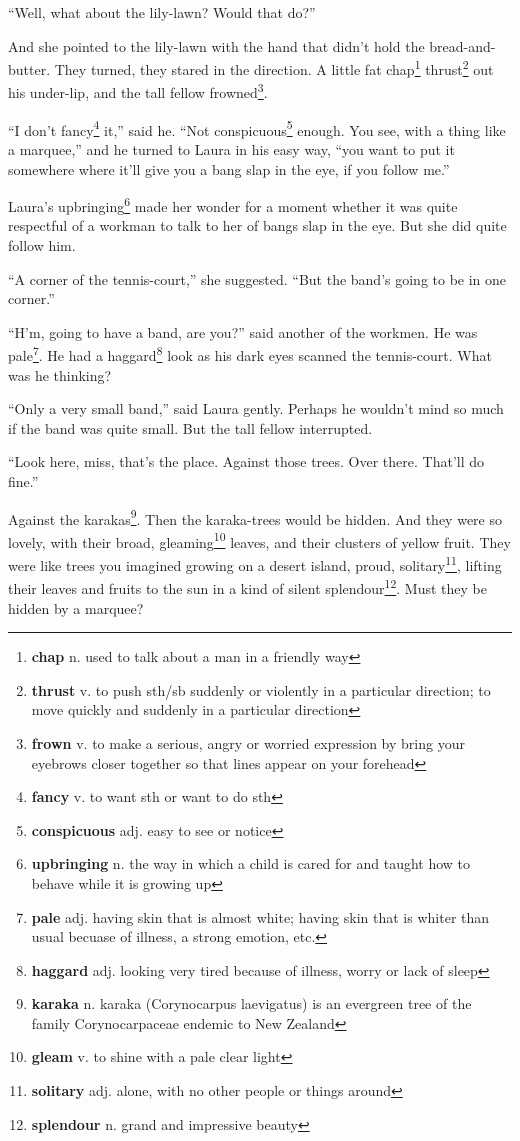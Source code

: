 ``Well, what about the lily-lawn? Would that do?''

And she pointed to the lily-lawn with the hand that didn't hold the bread-and-butter. They turned, they stared in the direction. A little fat chap\footnote{\textbf{chap} n. used to talk about a man in a friendly way} thrust\footnote{\textbf{thrust} v. to push sth/sb suddenly or violently in a particular direction; to move quickly and suddenly in a particular direction} out his under-lip, and the tall fellow frowned\footnote{\textbf{frown} v. to make a serious, angry or worried expression by bring your eyebrows closer together so that lines appear on your forehead}.

``I don't fancy\footnote{\textbf{fancy} v. to want sth or want to do sth} it,'' said he. ``Not conspicuous\footnote{\textbf{conspicuous} adj. easy to see or notice} enough. You see, with a thing like a marquee,'' and he turned to Laura in his easy way, ``you want to put it somewhere where it'll give you a bang slap in the eye, if you follow me.''

Laura's upbringing\footnote{\textbf{upbringing} n. the way in which a child is cared for and taught how to behave while it is growing up} made her wonder for a moment whether it was quite respectful of a workman to talk to her of bangs slap in the eye. But she did quite follow him.

``A corner of the tennis-court,'' she suggested. ``But the band's going to be in one corner.''

``H'm, going to have a band, are you?'' said another of the workmen. He was pale\footnote{\textbf{pale} adj. having skin that is almost white; having skin that is whiter than usual becuase of illness, a strong emotion, etc.}. He had a haggard\footnote{\textbf{haggard} adj. looking very tired because of illness, worry or lack of sleep} look as his dark eyes scanned the tennis-court. What was he thinking?

``Only a very small band,'' said Laura gently. Perhaps he wouldn't mind so much if the band was quite small. But the tall fellow interrupted.

``Look here, miss, that's the place. Against those trees. Over there. That'll do fine.''

Against the karakas\footnote{\textbf{karaka} n. karaka (Corynocarpus laevigatus) is an evergreen tree of the family Corynocarpaceae endemic to New Zealand}. Then the karaka-trees would be hidden. And they were so lovely, with their broad, gleaming\footnote{\textbf{gleam} v. to shine with a pale clear light} leaves, and their clusters of yellow fruit. They were like trees you imagined growing on a desert island, proud, solitary\footnote{\textbf{solitary} adj. alone, with no other people or things around}, lifting their leaves and fruits to the sun in a kind of silent splendour\footnote{\textbf{splendour} n. grand and impressive beauty}. Must they be hidden by a marquee?

